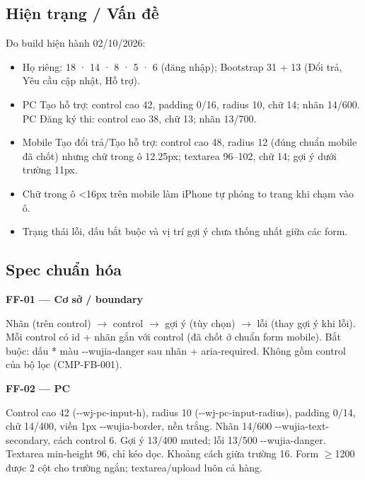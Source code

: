 \documentclass[11pt,a4paper]{report}
\begin{document}
\subsection*{Hiện trạng / Vấn đề}
Đo build hiện hành 02/\allowbreak{}10/\allowbreak{}2026:\par
\begin{itemize}
\item Họ riêng:  18 ·  14 ·  8 ·  5 ·  6 (đăng nhập); Bootstrap  31 +  13 (Đổi trả, Yêu cầu cập nhật, Hỗ trợ).
\item PC Tạo hỗ trợ: control cao 42, padding 0/\allowbreak{}16, radius 10, chữ 14; nhãn 14/\allowbreak{}600. PC Đăng ký thi: control cao 38, chữ 13; nhãn 13/\allowbreak{}700.
\item Mobile Tạo đổi trả/\allowbreak{}Tạo hỗ trợ: control cao 48, radius 12 (đúng chuẩn mobile đã chốt) nhưng chữ trong ô 12.25px; textarea 96–102, chữ 14; gợi ý dưới trường 11px.
\item Chữ trong ô \textless{}16px trên mobile làm iPhone tự phóng to trang khi chạm vào ô.
\item Trạng thái lỗi, dấu bắt buộc và vị trí gợi ý chưa thống nhất giữa các form.
\end{itemize}
\subsection*{Spec chuẩn hóa}
\par\smallskip\textbf{FF-01 — Cơ sở / boundary}\par
Nhãn (trên control) \(\to\) control \(\to\) gợi ý (tùy chọn) \(\to\) lỗi (thay gợi ý khi lỗi). Mỗi control có id + nhãn gắn với control (đã chốt ở chuẩn form mobile). Bắt buộc: dấu * màu -\kern0pt-\allowbreak{}wujia-\allowbreak{}danger sau nhãn + aria-\allowbreak{}required. Không gồm control của bộ lọc (CMP-FB-001).\par

\par\smallskip\textbf{FF-02 — PC}\par
Control cao 42 (-\kern0pt-\allowbreak{}wj-\allowbreak{}pc-\allowbreak{}input-\allowbreak{}h), radius 10 (-\kern0pt-\allowbreak{}wj-\allowbreak{}pc-\allowbreak{}input-\allowbreak{}radius), padding 0/\allowbreak{}14, chữ 14/\allowbreak{}400, viền 1px -\kern0pt-\allowbreak{}wujia-\allowbreak{}border, nền trắng. Nhãn 14/\allowbreak{}600 -\kern0pt-\allowbreak{}wujia-\allowbreak{}text-\allowbreak{}secondary, cách control 6. Gợi ý 13/\allowbreak{}400 muted; lỗi 13/\allowbreak{}500 -\kern0pt-\allowbreak{}wujia-\allowbreak{}danger. Textarea min-\allowbreak{}height 96, chỉ kéo dọc. Khoảng cách giữa trường 16. Form \(\geq\)1200 được 2 cột cho trường ngắn; textarea/\allowbreak{}upload luôn cả hàng.\par
\end{document}

